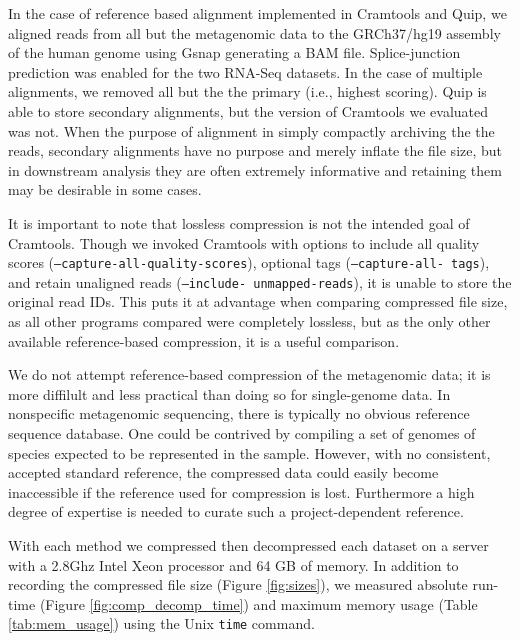\documentclass[twocolumn]{article}
\begin{document}

In the case of reference based alignment implemented in Cramtools and Quip, we
aligned reads from all but the metagenomic data to the GRCh37/hg19 assembly of
the human genome using Gsnap generating a BAM file. Splice-junction prediction
was enabled for the two RNA-Seq datasets. In the case of multiple alignments,
we removed all but the the primary (i.e., highest scoring). Quip is able to
store secondary alignments, but the version of Cramtools we evaluated was not.
When the purpose of alignment in simply compactly archiving the the reads,
secondary alignments have no purpose and merely inflate the file size, but in
downstream analysis they are often extremely informative and retaining them
may be desirable in some cases.


It is important to note that lossless compression is not the intended goal of
Cramtools. Though we invoked Cramtools with options to include all quality
scores (\texttt{--capture-all-quality-scores}), optional tags (\texttt
{--capture-all- tags}), and retain unaligned reads (\texttt{--include-
unmapped-reads}), it is unable to store the original read IDs. This puts it at
advantage when comparing compressed file size, as all other programs compared
were completely lossless, but as the only other available reference-based
compression, it is a useful comparison.



We do not attempt reference-based compression of the metagenomic data; it is
more diffilult and less practical than doing so for single-genome data. In
nonspecific metagenomic sequencing, there is typically no obvious reference
sequence database. One could be contrived by compiling a set of genomes of
species expected to be represented in the sample. However, with no consistent,
accepted standard reference, the compressed data could easily become
inaccessible if the reference used for compression is lost. Furthermore a high
degree of expertise is needed to curate such a project-dependent reference.


With each method we compressed then decompressed each dataset on a server with
a 2.8Ghz Intel Xeon processor and 64 GB of memory. In addition to recording
the compressed file size (Figure \ref{fig:sizes}), we measured absolute run-
time (Figure \ref{fig:comp_decomp_time}) and maximum memory usage (Table
\ref{tab:mem_usage}) using the Unix \texttt{time} command.
\end{document}
